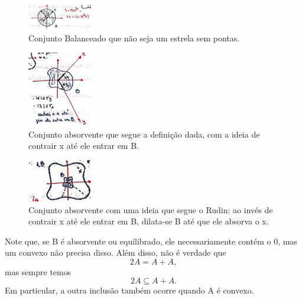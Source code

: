 \documentclass[../distribution_theory_notes.tex]{subfiles}
\begin{document}
\begin{figure}[H]
	\begin{center}
		\includegraphics[height=0.25\textheight, width=0.25\textwidth, keepaspectratio]{./Images/balanced.png}
	\end{center}
	\caption{Conjunto Balanceado que não seja um estrela sem pontas.}
	\label{bal1}
\end{figure}

\begin{figure}[H]
	\begin{center}
		\includegraphics[height=0.25\textheight, width=0.25\textwidth, keepaspectratio]{./Images/absorbing.png}
	\end{center}
	\caption{Conjunto absorvente que segue a definição dada, com a ideia de contrair x até ele entrar em B.}
	\label{abs1}
\end{figure}


\begin{figure}[H]
	\begin{center}
		\includegraphics[height=0.25\textheight, width=0.25\textwidth, keepaspectratio]{./Images/absorbing_rudin.png}
	\end{center}
	\caption{Conjunto absorvente com uma ideia que segue o Rudin: ao invés de contrair x até ele entrar em B, dilata-se B até que ele absorva o x.}
	\label{abs2}
\end{figure}

Note que, se B é absorvente ou equilibrado, ele necessariamente contém o 0, mas um convexo não precisa disso. Além disso, não é verdade que
\[
	2A = A + A,
\]
mas sempre temos
\[
	2A \subseteq A + A.
\]
Em particular, a outra inclusão também ocorre quando A é convexo.
\end{document}
